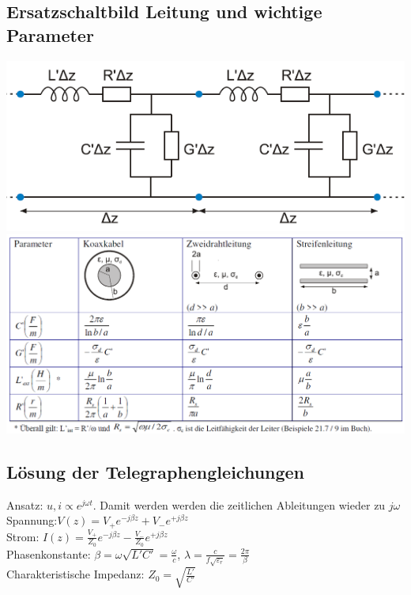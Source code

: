 \documentclass[english]{latex4ei/latex4ei_sheet}
\begin{document}
\begin{sectionbox}
	\subsection{Ersatzschaltbild Leitung und wichtige Parameter}
	\includegraphics[width = \columnwidth]{./img/ersatzschaltbild_leitung.png}\\
	\includegraphics[width = \columnwidth]{./img/parameter_leitungen.png}\\
\end{sectionbox}
\begin{sectionbox}
	\subsection{Lösung der Telegraphengleichungen}
	Ansatz: $u,i \propto e^{j\omega t}$. Damit werden werden die zeitlichen Ableitungen wieder zu $j\omega$\\
	
	Spannung:\qquad $V(z) = V_+ e^{-j\beta z} + V_- e^{+j\beta z}$\\
	Strom:	\qquad$I(z) = \frac{V_+}{Z_0} e^{-j\beta z} - \frac{V_-}{Z_0} e^{+j\beta z}$\\
	Phasenkonstante: $\beta = \omega\sqrt{L' C'} = \frac{\omega}{c}$, $\lambda = \frac{c}{f\sqrt{\varepsilon_r}} = \frac{2\pi}{\beta}$\\
	Charakteristische Impedanz: $Z_0 = \sqrt{\frac{L'}{C'}}$
	
\end{sectionbox}
\end{document}

